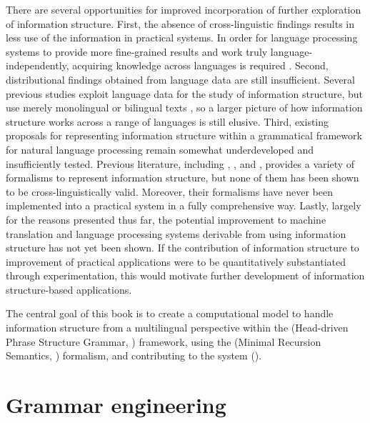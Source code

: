 There are several opportunities for improved incorporation of further
exploration of information structure.  First, the absence of
cross-linguistic findings results in less use of the information in
practical systems.  In order for language processing systems to
provide more fine-grained results and work truly
language-independently, acquiring knowledge across languages is
required \citep{bender:11}.  Second, distributional findings obtained
from language data are still insufficient. Several previous studies
exploit language data for the study of information structure, but use
merely monolingual or bilingual texts
\citep{komagata:99,johansson:01,bouma:etal:10,hasegawa:koenig:11}, so
a larger picture of how information structure works across a range of
languages is still elusive.  Third, existing proposals for
representing information structure within a grammatical framework for
natural language processing remain somewhat underdeveloped and
insufficiently tested.  Previous literature, including
\citet{king:97}, \citet{steedman:00}, and \citet{bildhauer:07},
provides a variety of formalisms to represent information structure,
but none of them has been shown to be cross-linguistically
valid. Moreover, their formalisms have never been implemented into a
practical system in a fully comprehensive way.  Lastly, largely for
the reasons presented thus far, the potential improvement to machine
translation and language processing systems derivable from using
information structure has not yet been shown. If the contribution of
information structure to improvement of practical applications were to
be quantitatively substantiated through experimentation, this would
motivate further development of information structure-based
applications.


The central goal of this book is to create a computational model to
handle information structure from a multilingual perspective within
the  (Head-driven Phrase Structure Grammar,
\citealt{pollard:sag:94}) framework, using the  (Minimal
Recursion Semantics, \citealt{copestake:etal:05}) formalism, and
contributing to the \lingo {} system
(\citealt{bender:etal:10}).



\section{Grammar engineering}
\label{2:sec:grammar-engineering}
\largerpage


